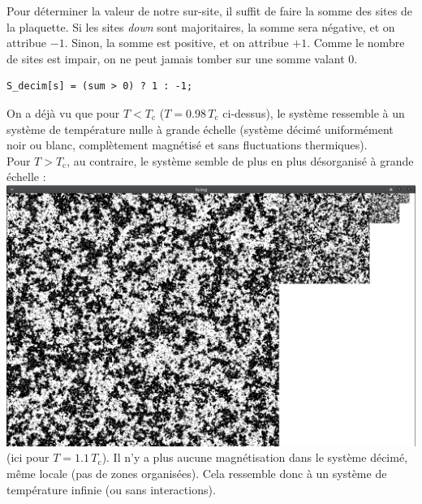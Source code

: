 \documentclass{book}
\begin{document}
\begin{correction}
Pour déterminer la valeur de notre sur-site, il suffit de faire la somme des sites de la plaquette. Si les sites \emph{down} sont majoritaires, la somme sera négative, et on attribue $-1$. Sinon, la somme est positive, et on attribue $+1$. Comme le nombre de sites est impair, on ne peut jamais tomber sur une somme valant $0$.

\begin{verbatim}
S_decim[s] = (sum > 0) ? 1 : -1;
\end{verbatim}

On a déjà vu que pour $T<T_\text{c}$ ($T=0.98\,T_\text{c}$ ci-dessus), le système ressemble à un système de température nulle à grande échelle (système décimé uniformément noir ou blanc, complètement magnétisé et sans fluctuations thermiques).\\

Pour $T>T_\text{c}$, au contraire, le système semble de plus en plus désorganisé à grande échelle :\\
\includegraphics[width=1\linewidth]{TD3/decim_T_sur_Tc_1.1.png}\\
(ici pour $T=1.1\,T_\text{c}$). Il n'y a plus aucune magnétisation dans le système décimé, même locale (pas de zones organisées). Cela ressemble donc à un système de température infinie (ou sans interactions).\\


\end{correction}
\end{document}
